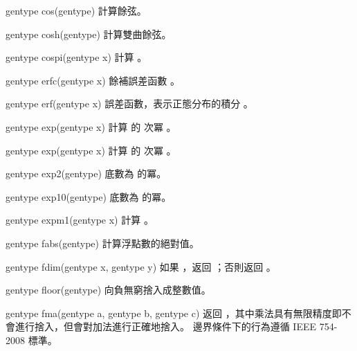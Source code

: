 gentype cos(gentype)
\stopbuffer
{}
計算餘弦。
\stopbuffer

gentype cosh(gentype)
\stopbuffer
{}
計算雙曲餘弦。
\stopbuffer

gentype cospi(gentype x)
\stopbuffer
{}
計算 。
\stopbuffer

gentype erfc(gentype x)
\stopbuffer
{}
餘補誤差函數
 。
\stopbuffer

gentype erf(gentype x)
\stopbuffer
{}
誤差函數，表示正態分布的積分
 。
\stopbuffer

gentype exp(gentype x)
\stopbuffer
{}
計算  的  次冪 。
\stopbuffer

gentype exp(gentype x)
\stopbuffer
{}
計算  的  次冪 。
\stopbuffer

gentype exp2(gentype)
\stopbuffer
{}
底數為  的冪。
\stopbuffer

gentype exp10(gentype)
\stopbuffer
{}
底數為  的冪。
\stopbuffer

gentype expm1(gentype x)
\stopbuffer
{}
計算 。
\stopbuffer

gentype fabs(gentype)
\stopbuffer
{}
計算浮點數的絕對值。
\stopbuffer

gentype fdim(gentype x,
	     gentype y)
\stopbuffer
{}
如果 ，返回 ；否則返回 。
\stopbuffer

gentype floor(gentype)
\stopbuffer
{}
向負無窮捨入成整數值。
\stopbuffer

gentype fma(gentype a,
	    gentype b,
	    gentype c)
\stopbuffer
{}
返回 ，其中乘法具有無限精度即不會進行捨入，但會對加法進行正確地捨入。
邊界條件下的行為遵循 IEEE 754-2008 標準。
\stopbuffer

